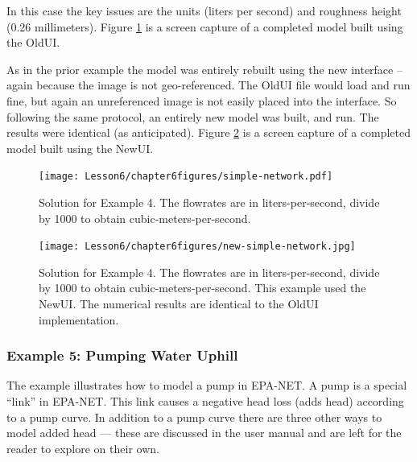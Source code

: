 In this case the key issues are the units (liters per second) and roughness height (0.26 millimeters).   
Figure \ref{fig:simple-network} is a screen capture of a completed model built using the OldUI.

As in the prior example the model was entirely rebuilt using the new interface -- again because the image is not geo-referenced.   The OldUI file would load and run fine, but again an unreferenced image is not easily placed into the interface.
So following the same protocol, an entirely new model was built, and run.
The results were identical (as anticipated).
Figure \ref{fig:new-simple-network} is a screen capture of a completed model built using the NewUI.

\begin{figure}[h!] %
   \centering
   \texttt{[image: Lesson6/chapter6figures/simple-network.pdf]} 
   \caption{Solution for Example 4.  The flowrates are in liters-per-second, divide by 1000 to obtain cubic-meters-per-second.}
   \label{fig:simple-network}
\end{figure}

\begin{figure}[h!] %
   \centering
   \texttt{[image: Lesson6/chapter6figures/new-simple-network.jpg]} 
   \caption{Solution for Example 4.  The flowrates are in liters-per-second, divide by 1000 to obtain cubic-meters-per-second.  This example used the NewUI.  The numerical results are identical to the OldUI implementation.}
   \label{fig:new-simple-network}
\end{figure}
\clearpage

\subsubsection{Example 5: Pumping Water Uphill}
The example illustrates how to model a pump in EPA-NET.  A pump is a special ``link'' in EPA-NET.  This link causes a negative head loss (adds head) according to a pump curve.  In addition to a pump curve there are three other ways to model added head --- these are discussed in the user manual and are left for the reader to explore on their own.

